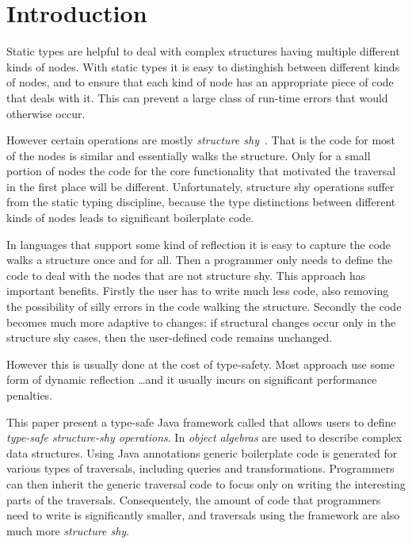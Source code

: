 \section{Introduction}

Static types are helpful to deal with complex structures having
multiple different kinds of nodes. With static types it is easy to
distinghish between different kinds of nodes, and to ensure that each
kind of node has an appropriate piece of code that deals with it. This
can prevent a large class of run-time errors that would otherwise
occur. 


However certain operations are mostly \emph{structure
  shy}~\cite{}. That is the code for most of the nodes is similar and
essentially walks the structure.  Only for a small portion of nodes
the code for the core functionality that motivated the
traversal in the first place will be different.  Unfortunately,
structure shy operations suffer from the static typing discipline,
because the type distinctions between different kinds of nodes leads
to significant boilerplate code.

In languages that support some kind of reflection it is easy to
capture the code walks a structure once and for all. Then a programmer
only needs to define the code to deal with the nodes that are not
structure shy. This approach has important benefits. Firstly the user
has to write much less code, also removing the possibility of silly
errors in the code walking the structure. Secondly the code becomes
much more adaptive to changes: if structural changes occur only in the
structure shy cases, then the user-defined code remains unchanged.

However this is usually done at the cost of type-safety.  Most
approach use some form of dynamic reflection \ldots and it usually
incurs on significant performance penalties. 

This paper present a type-safe Java framework called \name that allows
users to define \emph{type-safe structure-shy operations}.  In \name
\emph{object algebras} are used to describe complex data
structures. Using Java annotations generic boilerplate code is
generated for various types of traversals, including queries and
transformations. Programmers can then inherit the generic traversal
code to focus only on writing the interesting parts of the
traversals. Consequentely, the amount of code that programmers need to
write is significantly smaller, and traversals using the \name
framework are also much more \emph{structure shy}.

